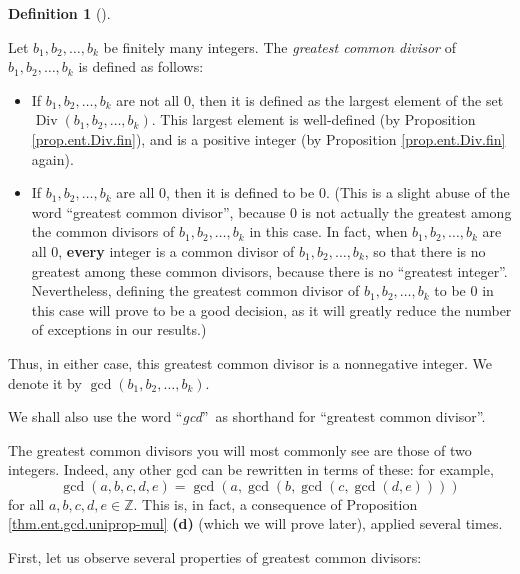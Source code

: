\documentclass[numbers=enddot,12pt,final,onecolumn,notitlepage]{scrartcl}%
\numberwithin{exer}{subsection}
\theoremstyle{definition}
\newtheorem{defi}[theo]{Definition}
\newenvironment{definition}[1][]
{\begin{defi}[#1]\begin{leftbar}}
{\end{leftbar}\end{defi}}
\begin{document}
\begin{definition}
\label{def.ent.gcd.gcd}Let $b_{1},b_{2},\ldots,b_{k}$ be finitely many
integers. The \textit{greatest common divisor} of $b_{1},b_{2},\ldots,b_{k}$
is defined as follows:

\begin{itemize}
\item If $b_{1},b_{2},\ldots,b_{k}$ are not all $0$, then it is defined as the
largest element of the set $\operatorname*{Div}\left(  b_{1},b_{2}%
,\ldots,b_{k}\right)  $. This largest element is well-defined (by Proposition
\ref{prop.ent.Div.fin}), and is a positive integer (by Proposition
\ref{prop.ent.Div.fin} again).

\item If $b_{1},b_{2},\ldots,b_{k}$ are all $0$, then it is defined to be $0$.
(This is a slight abuse of the word \textquotedblleft greatest common
divisor\textquotedblright, because $0$ is not actually the greatest among the
common divisors of $b_{1},b_{2},\ldots,b_{k}$ in this case. In fact, when
$b_{1},b_{2},\ldots,b_{k}$ are all $0$, \textbf{every} integer is a common
divisor of $b_{1},b_{2},\ldots,b_{k}$, so that there is no greatest among
these common divisors, because there is no \textquotedblleft greatest
integer\textquotedblright. Nevertheless, defining the greatest common divisor
of $b_{1},b_{2},\ldots,b_{k}$ to be $0$ in this case will prove to be a good
decision, as it will greatly reduce the number of exceptions in our results.)
\end{itemize}

Thus, in either case, this greatest common divisor is a nonnegative integer.
We denote it by $\gcd\left(  b_{1},b_{2},\ldots,b_{k}\right)  $.

We shall also use the word \textquotedblleft\textit{gcd}\textquotedblright\ as
shorthand for \textquotedblleft greatest common divisor\textquotedblright.
\end{definition}

The greatest common divisors you will most commonly see are those of two
integers. Indeed, any other gcd can be rewritten in terms of these: for
example,%
\[
\gcd\left(  a,b,c,d,e\right)  =\gcd\left(  a,\gcd\left(  b,\gcd\left(
c,\gcd\left(  d,e\right)  \right)  \right)  \right)
\]
for all $a,b,c,d,e\in\mathbb{Z}$. This is, in fact, a consequence of
Proposition \ref{thm.ent.gcd.uniprop-mul} \textbf{(d)} (which we will prove
later), applied several times.

First, let us observe several properties of greatest common divisors:
\end{document}
